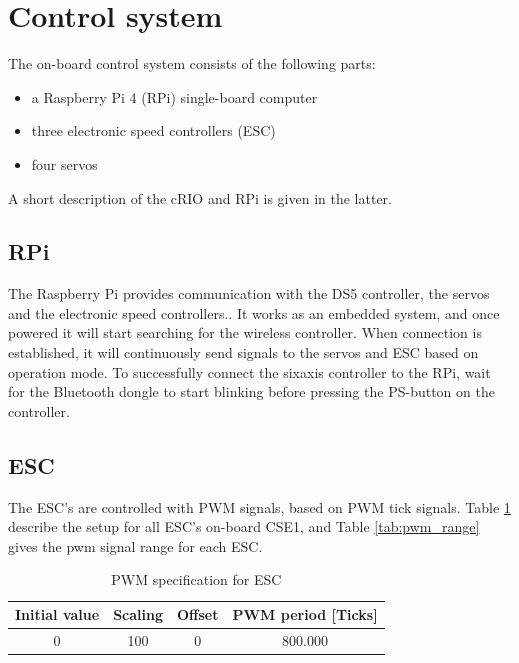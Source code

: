 \section{Control system}
The on-board control system consists of the following parts:
\begin{itemize}
	\item a Raspberry Pi 4 (RPi) single-board computer
	\item three electronic speed controllers (ESC)
	\item four servos
\end{itemize}
A short description of the cRIO and RPi is given in the latter. 
\subsection{RPi}

The Raspberry Pi provides communication 
with the DS5 controller, the servos and the electronic speed controllers.. It works as an embedded system, and once powered it will start searching for the wireless controller. When connection is established, it will continuously send signals to the servos and ESC based on operation mode. To successfully connect the sixaxis controller to the RPi, wait for the Bluetooth dongle to start blinking before pressing the PS-button on the controller. 

\subsection{ESC}
The ESC's are controlled with PWM signals, based on PWM tick signals. Table \ref{tab:pwm_spec} describe the setup for all ESC's on-board CSE1, and Table \ref{tab:pwm_range} gives the pwm signal range for each ESC.
\begin{table}[h!]
	\centering
	\caption{PWM specification for ESC}
	\label{tab:pwm_spec}
	\begin{tabular}{cccc}
		\hline
		\textbf{Initial value} & \textbf{Scaling} & \textbf{Offset} & \textbf{PWM period} [Ticks] \\ \hline
		0 & 100 & 0 & 800.000\\ \hline
	\end{tabular}
\end{table}

